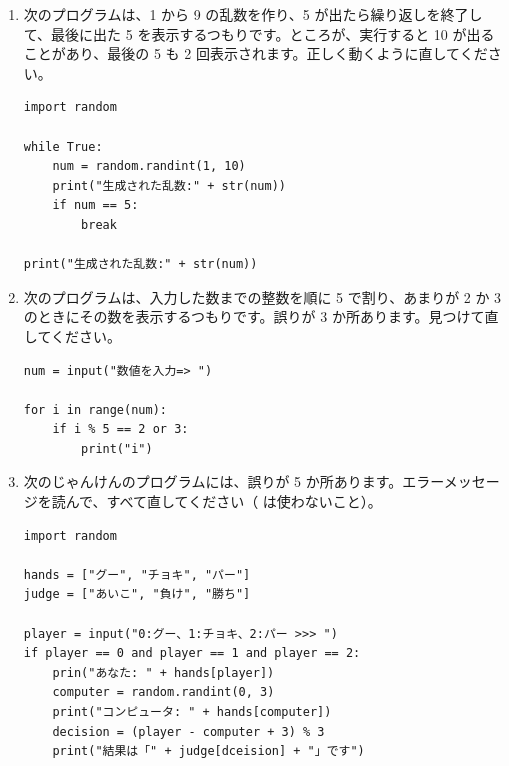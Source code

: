 \begin{exercise}
\begin{enumerate}
  \item 次のプログラムは、1 から 9 の乱数を作り、5 が出たら繰り返しを終了して、最後に出た 5 を表示するつもりです。ところが、実行すると 10 が出ることがあり、最後の 5 も 2 回表示されます。正しく動くように直してください。
\begin{lstlisting}[style=python, numbers=none, xleftmargin=0pt, framexleftmargin=0pt]
import random

while True:
    num = random.randint(1, 10)
    print("生成された乱数:" + str(num))
    if num == 5:
        break

print("生成された乱数:" + str(num))
\end{lstlisting}
  \item 次のプログラムは、入力した数までの整数を順に 5 で割り、あまりが 2 か 3 のときにその数を表示するつもりです。誤りが 3 か所あります。見つけて直してください。
\begin{lstlisting}[style=python, numbers=none, xleftmargin=0pt, framexleftmargin=0pt]
num = input("数値を入力=> ")

for i in range(num):
    if i % 5 == 2 or 3:
        print("i")
\end{lstlisting}
  \item 次のじゃんけんのプログラムには、誤りが 5 か所あります。エラーメッセージを読んで、すべて直してください（ は使わないこと）。
\begin{lstlisting}[style=python, numbers=none, xleftmargin=0pt, framexleftmargin=0pt]
import random

hands = ["グー", "チョキ", "パー"]
judge = ["あいこ", "負け", "勝ち"]

player = input("0:グー、1:チョキ、2:パー >>> ")
if player == 0 and player == 1 and player == 2:
    prin("あなた: " + hands[player])
    computer = random.randint(0, 3)
    print("コンピュータ: " + hands[computer])
    decision = (player - computer + 3) % 3
    print("結果は「" + judge[dceision] + "」です")
\end{lstlisting}
\end{enumerate}
\end{exercise}

